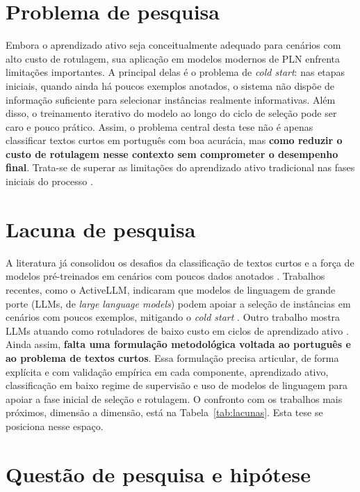 \section{Problema de pesquisa}
\label{sec:intro-problema}

Embora o aprendizado ativo seja conceitualmente adequado para cenários com alto custo
de rotulagem, sua aplicação em modelos modernos de PLN enfrenta limitações
importantes. A principal delas é o problema de \textit{cold start}: nas etapas
iniciais, quando ainda há poucos exemplos anotados, o sistema não dispõe de
informação suficiente para selecionar instâncias realmente informativas. Além disso,
o treinamento iterativo do modelo ao longo do ciclo de seleção pode ser caro e pouco
prático. Assim, o problema central desta tese não é apenas classificar textos curtos
em português com boa acurácia, mas \textbf{como reduzir o custo de rotulagem nesse
contexto sem comprometer o desempenho final}. Trata-se de superar as limitações do
aprendizado ativo tradicional nas fases iniciais do processo
\citep{zhang-etal-2022-survey}.

\section{Lacuna de pesquisa}
\label{sec:intro-lacuna}

A literatura já consolidou os desafios da classificação de textos curtos e a força de
modelos pré-treinados em cenários com poucos dados anotados
\citep{Alsmadi2019,Song2014,Devlin2019,Souza2020BERTimbau}. Trabalhos recentes, como o
ActiveLLM, indicaram que modelos de linguagem de grande porte (LLMs, de
\textit{large language models}) podem apoiar a seleção
de instâncias em cenários com poucos exemplos, mitigando o \textit{cold start}
\citep{Bayer2024ActiveLLM}. Outro trabalho mostra LLMs atuando como rotuladores de
baixo custo em ciclos de aprendizado ativo \citep{Zhang2025}. Ainda assim, \textbf{falta uma
formulação metodológica voltada ao português e ao problema de textos
curtos}. Essa formulação precisa articular, de forma explícita e
com validação empírica em cada componente, aprendizado ativo, classificação em baixo
regime de supervisão e uso de modelos de linguagem para apoiar a fase inicial de
seleção e rotulagem. O
confronto com os trabalhos mais próximos, dimensão a dimensão, está na
Tabela~\ref{tab:lacunas}. Esta tese se posiciona nesse espaço.

\section{Questão de pesquisa e hipótese}
\label{sec:intro-hipotese}

